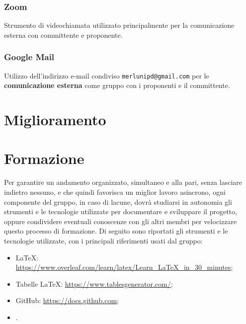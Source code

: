 \subsubsection{Zoom}
Strumento di videochiamata utilizzato principalmente per la comunicazione esterna con committente e proponente.

\subsubsection{Google Mail}
Utilizzo dell'indirizzo e-mail condiviso \texttt{merlunipd@gmail.com} per le \textbf{comunicazione esterna} come gruppo con i proponenti e il committente.

\section{Miglioramento}

\section{Formazione}
Per garantire un andamento organizzato, simultaneo e alla pari, senza lasciare indietro nessuno, e che quindi favorisca un miglior lavoro 
asincrono, ogni componente del gruppo, in caso di lacune, dovrà studiarsi in autonomia gli strumenti e le tecnologie utilizzate per documentare e sviluppare
il progetto, oppure condividere eventuali conoscenze con gli altri membri per velocizzare questo processo di formazione.
\newline
Di seguito sono riportati gli strumenti e le tecnologie utilizzate, con i principali riferimenti usati dal gruppo:
\begin{itemize}
    \item LaTeX: \url{https://www.overleaf.com/learn/latex/Learn_LaTeX_in_30_minutes};
    \item Tabelle LaTeX: \url{https://www.tablesgenerator.com/};
    \item GitHub: \url{https://docs.github.com};
    \item {}.
\end{itemize}